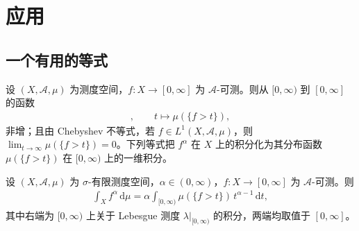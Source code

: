 \documentclass[../../main.tex]{subfiles}%
\begin{document}
\section{应用}\label{section:ch02-应用}
\label{section:ch02-进一步讨论}

\subsection{一个有用的等式}\label{subsection:ch02-有用等式}

设 $(X,\mathscr A,\mu)$ 为测度空间，$f:X\to[0,\infty]$ 为 $\mathscr A$-可测。则从 $[0,\infty)$ 到 $[0,\infty]$ 的函数
\begin{align*}
[0,\infty)\to[0,\infty],\qquad t\mapsto\mu(\{f>t\}),
\end{align*}
非增；且由 Chebyshev 不等式，若 $f\in L^1(X,\mathscr A,\mu)$，则 $\lim_{t\to\infty}\mu(\{f>t\})=0$。下列等式把 $f^\alpha$ 在 $X$ 上的积分化为其分布函数 $\mu(\{f>t\})$ 在 $[0,\infty)$ 上的一维积分。

\begin{proposition}\label{proposition:ch02-尾部积分}
设 $(X,\mathscr A,\mu)$ 为 $\sigma$-有限测度空间，$\alpha\in(0,\infty)$，$f:X\to[0,\infty]$ 为 $\mathscr A$-可测。则
\begin{align}
\int_Xf^\alpha\,\mathrm{d}\mu=\alpha\int_{[0,\infty)}\mu(\{f>t\})\,t^{\alpha-1}\,\mathrm{d}t, \label{align:ch02-2.19}
\end{align}
其中右端为 $[0,\infty)$ 上关于 Lebesgue 测度 $\lambda|_{[0,\infty)}$ 的积分，两端均取值于 $[0,\infty]$。
\end{proposition}
\end{document}
